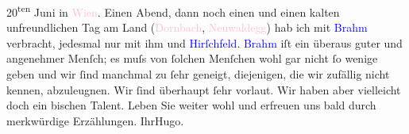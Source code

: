                             20\textsuperscript{ten} Juni in \textcolor{pink}{Wien}{}\ledrightnote{\textcolor{pink}{Wien}}. Einen Abend, dann noch einen und einen kalten
                    unfreundlichen Tag am Land (\textcolor{pink}{Dornbach}{}\ledrightnote{\textcolor{pink}{Dornbach}}, \textcolor{pink}{Neuwaldegg}{}\ledrightnote{\textcolor{pink}{Neuwaldegg}}) hab ich mit \textcolor{blue}{Brahm}{}\ledrightnote{\textcolor{blue}{Otto Brahm}} verbracht, jedesmal {\pb}nur mit ihm und \textcolor{blue}{Hirſchfeld}{}\ledrightnote{\textcolor{blue}{Georg Hirschfeld}}. \textcolor{blue}{Brahm}{}\ledrightnote{\textcolor{blue}{Otto Brahm}} iſt ein überaus guter und angenehmer Menſch; es muſs von ſolchen
                    Menſchen wohl gar nicht ſo wenige geben und wir ſind manchmal zu ſehr geneigt,
                    diejenigen, die wir zufällig nicht kennen, abzuleugnen. Wir ſind überhaupt ſehr
                    vorlaut. Wir haben aber vielleicht doch ein bischen Talent.\pend
           \pstart
           Leben Sie weiter wohl und erfreuen uns bald durch merkwürdige Erzählungen.\pend
           \pstart Ihr\spacefill\mbox{Hugo.}\pend{}\endnumbering{}  
      